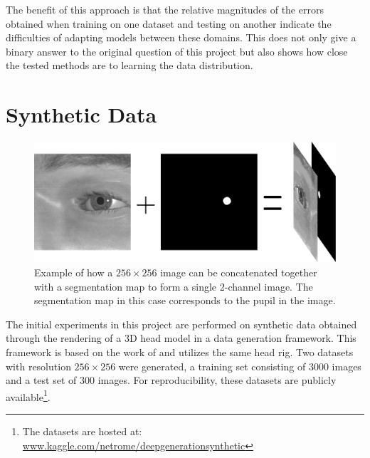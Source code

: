 The benefit of this approach is that the relative magnitudes of the errors obtained when training on one dataset and testing on another indicate the difficulties of adapting models between these domains. This does not only give a binary answer to the original question of this project but also shows how close the tested methods are to learning the data distribution. %


\section{Synthetic Data}
\begin{figure}[t]
    \centering
    \includegraphics[width=\textwidth]{images/misc/2-channel_img_example2.pdf}
    \caption{Example of how a $256\times256$ image can be concatenated together with a segmentation map to form a single 2-channel image. The segmentation map in this case corresponds to the pupil in the image.}
    \label{fig:2channels}
\end{figure}

The initial experiments in this project are performed on synthetic data obtained through the rendering of a 3D head model in a data generation framework. This framework is based on the work of \textcite{swirski2014rendering} and utilizes the same head rig. Two datasets with resolution $256\times256$ were generated, a training set consisting of $3000$ images and a test set of $300$ images. For reproducibility, these datasets are publicly available\footnote{The datasets are hosted at: \url{www.kaggle.com/netrome/deepgenerationsynthetic}}.


